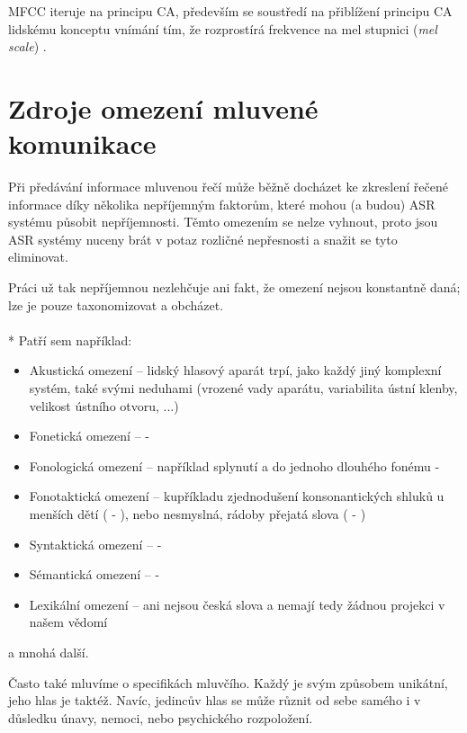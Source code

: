 MFCC iteruje na principu CA, především se soustředí na přiblížení principu CA lidskému konceptu vnímání tím, že rozprostírá frekvence na mel stupnici ({\sl mel scale}) \cite{hossan_2010}.

\section{Zdroje omezení mluvené komunikace}

Při předávání informace mluvenou řečí může běžně docházet ke zkreslení řečené informace díky několika nepříjemným faktorům, které mohou (a budou) ASR systému působit nepříjemnosti. Těmto omezením se nelze vyhnout, proto jsou ASR systémy nuceny brát v potaz rozličné nepřesnosti a snažit se tyto eliminovat.

Práci už tak nepříjemnou nezlehčuje ani fakt, že omezení nejsou konstantně daná; lze je pouze taxonomizovat a obcházet.
\\\\*
Patří sem například:

\begin{itemize}
\item Akustická omezení -- lidský hlasový aparát trpí, jako každý jiný komplexní systém, také svými neduhami (vrozené vady aparátu, variabilita ústní klenby, velikost ústního otvoru, ...)
\item Fonetická omezení --  - 
\item Fonologická omezení -- například splynutí  a  do jednoho dlouhého fonému - 
\item Fonotaktická omezení -- kupříkladu zjednodušení konsonantických shluků u menších dětí ( - ), nebo nesmyslná, rádoby přejatá slova ( - )
\item Syntaktická omezení --  - 
\item Sémantická omezení --  - 
\item Lexikální omezení --  ani  nejsou česká slova a nemají tedy žádnou projekci v našem vědomí
\end{itemize}

a mnohá další.

Často také mluvíme o specifikách mluvčího. Každý je svým způsobem unikátní, jeho hlas je taktéž. Navíc, jedincův hlas se může různit od sebe samého i v důsledku únavy, nemoci, nebo psychického rozpoložení.

